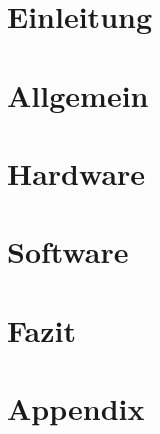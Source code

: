 \cleardoublepage
\tableofcontents

\cleardoublepage
\chapter{Einleitung}


\cleardoublepage
\chapter{Allgemein}


\cleardoublepage
\chapter{Hardware}


\cleardoublepage
\chapter{Software}


\cleardoublepage
\chapter{Fazit}


\cleardoublepage
\chapter{Appendix}
